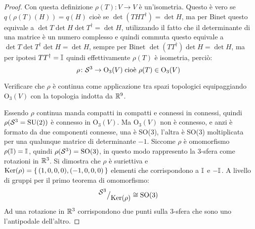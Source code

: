 \begin{proof}
  Con questa definizione $ \rho(T) \colon V \to V $ è un'isometria. Questo è vero se
  $ q(\rho(T)(H)) = q(H) $ cioè se $ \det(THT^\dagger) = \det{H} $, ma per Binet questo
  equivale a $ \det{T}\det{H}\det{T^\dagger} = \det{H} $, utilizzando il fatto che il
  determinante di una matrice è un numero complesso e quindi commuta questo
  equivale a $ \det{T}\det{T^\dagger}\det{H} = \det{H} $, sempre per Binet
  $ \det(TT^\dagger)\det{H} = \det{H} $, ma per ipotesi $ TT^\dagger = \mathbb{I}_{} $ quindi
  effettivamente $ \rho(T) $ è isometria, perciò:
  \[
    \rho \colon \mathcal{S}^{3} \to \mathrm{O}_3(V) \; \text{cioè } \rho(T) \in \mathrm{O}_3(V)
  \]
  \vspace*{-20pt}
  \begin{exercise}
    Verificare che $ \rho $ è continua come applicazione tra spazi topologici
    equipaggiando $ \mathrm{O}_3(V) $ con la topologia indotta da $ \mathbb{R}^{9} $.
  \end{exercise}
  Essendo $ \rho $ continua manda compatti in compatti e connessi in connessi,
  quindi $ \rho(\mathcal{S}^{3}= \mathrm{SU(2)}) $ è connesso in $ \mathrm{O}_3(V) $. Ma
  $ \mathrm{O}_3(V) $ non è connesso, e anzi è formato da due componenti
  connesse, una è SO(3), l'altra è SO(3) moltiplicata per una qualunque matrice
  di determinante $ - 1 $. Siccome $ \rho $ è omomorfismo
  $ \rho(\mathbb{I}_{}) = \mathbb{I}_{} $, quindi $ \rho(\mathcal{S}^{3}) = \mathrm{SO(3)} $, in questo modo
  rappresento la $ 3 $-sfera come rotazioni in $ \mathbb{R}^{3} $. Si dimostra che
  $ \rho $ è suriettiva e $ \mathrm{Ker}( \rho) = \set{(1,0,0,0), (-1,0,0,0)} $ elementi che
  corrispondono a $ \mathbb{I}_{} $ e $ -\mathbb{I}_{} $. A livello di gruppi per il primo
  teorema di omomorfismo:
  \[
    {^{\textstyle \mathcal{S}^{3}}\big/_{\textstyle \mathrm{Ker}( \rho)}} \cong \mathrm{SO(3)}
  \]
  Ad una rotazione in $ \mathbb{R}^{3} $ corrispondono due punti sulla $ 3 $-sfera che sono
  uno l'antipodale dell'altro.


\end{proof}

